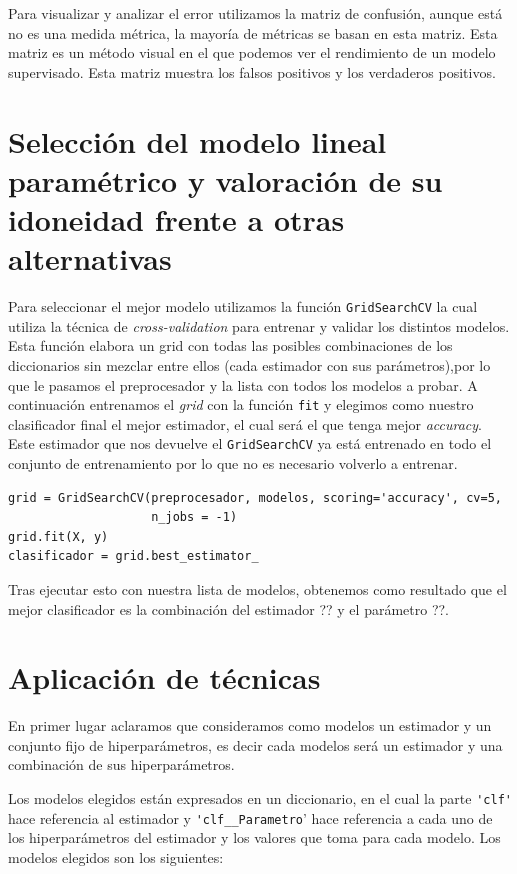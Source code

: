 \documentclass[size=a4, parskip=half, titlepage=false, toc=flat, toc=bib, 12pt]{scrartcl}
\begin{document}
Para visualizar y analizar el error utilizamos la matriz de confusión, aunque está no es una medida métrica, la mayoría de métricas se basan en esta matriz. Esta matriz es un método visual en el que podemos ver el rendimiento de un modelo supervisado. Esta matriz muestra los falsos positivos y los verdaderos positivos.
\section{Selección del modelo lineal paramétrico y valoración de su idoneidad frente a otras alternativas}

Para seleccionar el mejor modelo utilizamos la función \verb|GridSearchCV| la cual utiliza la técnica de \textit{cross-validation} para entrenar y validar los distintos modelos. Esta función elabora un grid con todas las posibles combinaciones de los diccionarios sin mezclar entre ellos (cada estimador con sus parámetros),por lo que le pasamos el preprocesador y la lista con todos los modelos a probar. A continuación entrenamos el \textit{grid} con la función \verb|fit| y elegimos como nuestro clasificador final el mejor estimador, el cual será el que tenga mejor \textit{accuracy}. Este estimador que nos devuelve el \verb|GridSearchCV| ya está entrenado en todo el conjunto de entrenamiento por lo que no es necesario volverlo a entrenar.
\begin{verbatim}
grid = GridSearchCV(preprocesador, modelos, scoring='accuracy', cv=5,
                    n_jobs = -1)
grid.fit(X, y)
clasificador = grid.best_estimator_
\end{verbatim}

Tras ejecutar esto con nuestra lista de modelos, obtenemos como resultado que el mejor clasificador es la combinación del estimador ?? y el parámetro ??.

\section{Aplicación de técnicas}
En primer lugar aclaramos que consideramos como modelos un estimador y un conjunto fijo de hiperparámetros, es decir cada modelos será un estimador y una combinación de sus hiperparámetros.

Los modelos elegidos están expresados en un diccionario, en el cual la parte \verb|'clf'| hace referencia al estimador y \verb|'clf__Parametro|' hace referencia a cada uno de los hiperparámetros del estimador y los valores que toma para cada modelo. Los modelos elegidos son los siguientes:
\end{document}
